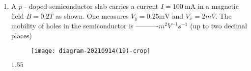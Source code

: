 \begin{enumerate}
\begin{answer}
	\end{answer}
	\item A $p$ - doped semiconductor slab carries a current $I=100 \mathrm{~mA}$ in a magnetic field $B=0.2 T$ as shown. One measures $V_{y}=0.25 \mathrm{mV}$ and $V_{x}=2 m V .$ The mobility of holes in the semiconductor is ----------$m^{2} V^{-1} s^{-1}$ (up to two decimal places)
	{	}
	\begin{figure}[H]
		\centering
		\texttt{[image: diagram-20210914(19)-crop]}
	\end{figure}
	\begin{answer}
		$1.55$
	\end{answer}
\end{enumerate}